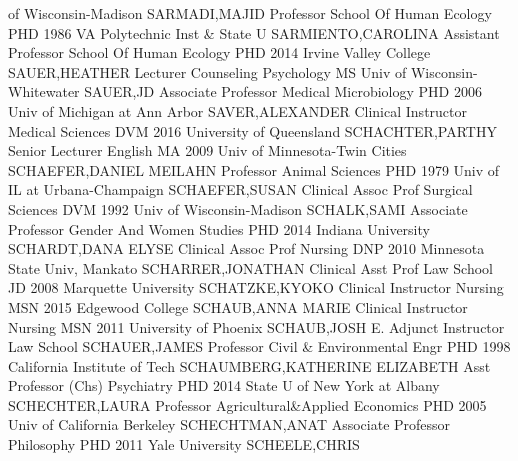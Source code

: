 \documentclass[
]{article}
\begin{document}
of Wisconsin-Madison \textbar SARMADI,MAJID \textbar Professor
\textbar{}  \textbar School Of Human Ecology \textbar PHD
1986 VA Polytechnic Inst \& State U \textbar SARMIENTO,CAROLINA
\textbar Assistant Professor \textbar{}  \textbar School Of
Human Ecology \textbar PHD 2014 Irvine Valley College
\textbar SAUER,HEATHER \textbar Lecturer \textbar{} 
\textbar Counseling Psychology \textbar MS Univ of Wisconsin-Whitewater
\textbar SAUER,JD \textbar Associate Professor \textbar{} 
\textbar Medical Microbiology \textbar PHD 2006 Univ of Michigan at Ann
Arbor \textbar SAVER,ALEXANDER \textbar Clinical Instructor \textbar{}
 \textbar Medical Sciences \textbar DVM 2016 University of
Queensland \textbar SCHACHTER,PARTHY \textbar Senior Lecturer \textbar{}
 \textbar English \textbar MA 2009 Univ of Minnesota-Twin
Cities \textbar SCHAEFER,DANIEL MEILAHN \textbar Professor \textbar{}
 \textbar Animal Sciences \textbar PHD 1979 Univ of IL at
Urbana-Champaign \textbar SCHAEFER,SUSAN \textbar Clinical Assoc Prof
\textbar{}  \textbar Surgical Sciences \textbar DVM 1992
Univ of Wisconsin-Madison \textbar SCHALK,SAMI \textbar Associate
Professor \textbar{}  \textbar Gender And Women Studies
\textbar PHD 2014 Indiana University \textbar SCHARDT,DANA ELYSE
\textbar Clinical Assoc Prof \textbar{}  \textbar Nursing
\textbar DNP 2010 Minnesota State Univ, Mankato
\textbar SCHARRER,JONATHAN \textbar Clinical Asst Prof \textbar{}
 \textbar Law School \textbar JD 2008 Marquette University
\textbar SCHATZKE,KYOKO \textbar Clinical Instructor \textbar{}
 \textbar Nursing \textbar MSN 2015 Edgewood College
\textbar SCHAUB,ANNA MARIE \textbar Clinical Instructor \textbar{}
 \textbar Nursing \textbar MSN 2011 University of Phoenix
\textbar SCHAUB,JOSH E. \textbar Adjunct Instructor \textbar{}
 \textbar Law School \textbar SCHAUER,JAMES
\textbar Professor \textbar Civil \& Environmental Engr \textbar{}
 \textbar PHD 1998 California Institute of Tech
\textbar SCHAUMBERG,KATHERINE ELIZABETH \textbar Asst Professor (Chs)
\textbar Psychiatry \textbar{}  \textbar PHD 2014 State U of
New York at Albany \textbar SCHECHTER,LAURA \textbar Professor
\textbar Agricultural\&Applied Economics \textbar{} 
\textbar PHD 2005 Univ of California Berkeley \textbar SCHECHTMAN,ANAT
\textbar Associate Professor \textbar Philosophy \textbar{} 
\textbar PHD 2011 Yale University \textbar SCHEELE,CHRIS
\end{document}
